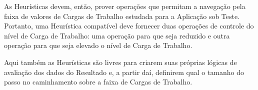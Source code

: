 As Heurísticas devem, então, prover operações que permitam a navegação pela
faixa de valores de Cargas de Trabalho estudada para a Aplicação sob Teste. 
Portanto, uma Heurística compatível deve fornecer duas operações de controle do
nível de Carga de Trabalho: uma operação para que seja reduzido e outra operação 
para que seja elevado o nível de Carga de Trabalho.

Aqui também as Heurísticas são livres para criarem suas próprias lógicas de 
avaliação dos dados do Resultado e, a partir daí, definirem qual o tamanho do
passo no caminhamento sobre a faixa de Cargas de Trabalho.
 
